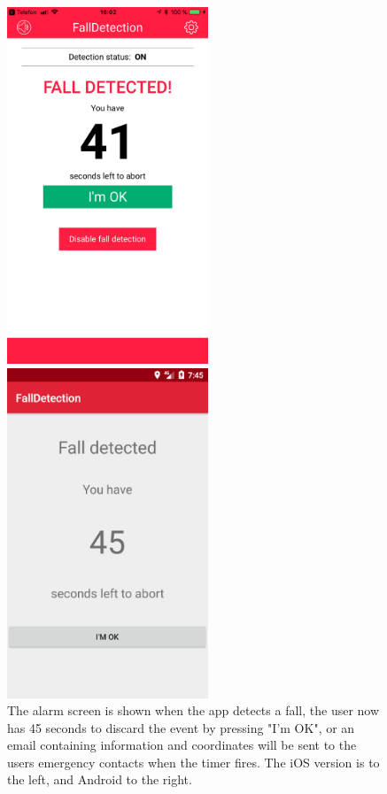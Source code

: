 \documentclass[12pt, a4paper, onecolumn]{article}
\begin{document}
	\begin{figure}[H]
		\begin{multicols}{2}
			\centering
			\includegraphics[width=6cm]{../img/screenshots/alarm-screen.jpg}\par 
			\includegraphics[width=6cm]{../img/screenshots/alarm-screen-android.png}\par 
		\end{multicols}
		\caption{The alarm screen is shown when the app detects a fall, the user now has 45 seconds to discard the event by pressing "I'm OK", or an email containing information and coordinates will be sent to the users emergency contacts when the timer fires. The iOS version is to the left, and Android to the right.}%
		\label{fig:alarm-screen}%
	\end{figure}
	
\end{document}
